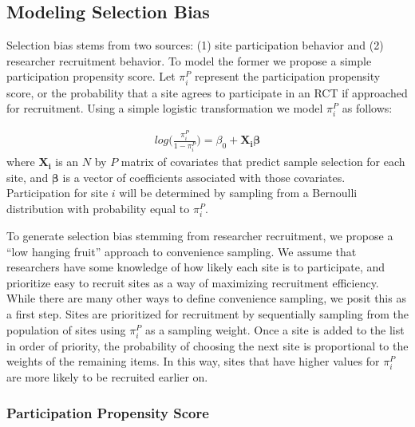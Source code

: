 \documentclass[man,floatsintext]{apa6}
\begin{document}
\hypertarget{modeling-selection-bias}{%
\subsection{Modeling Selection Bias}\label{modeling-selection-bias}}

Selection bias stems from two sources: (1) site participation behavior and (2) researcher recruitment behavior. To model the former we propose a simple participation propensity score. Let \(\pi^P_i\) represent the participation propensity score, or the probability that a site agrees to participate in an RCT if approached for recruitment. Using a simple logistic transformation we model \(\pi^P_i\) as follows:

\begin{align} \label{eq:RGM}
  log\bigg(\frac{\pi^P_i}{1 - \pi^P_i}\bigg) = \beta_0 + \boldsymbol{X_i \beta}
\end{align}
where \(\boldsymbol{X_i}\) is an \(N\) by \(P\) matrix of covariates that predict sample selection for each site, and \(\boldsymbol{\beta}\) is a vector of coefficients associated with those covariates. Participation for site \(i\) will be determined by sampling from a Bernoulli distribution with probability equal to \(\pi^P_i\).

To generate selection bias stemming from researcher recruitment, we propose a \enquote{low hanging fruit} approach to convenience sampling. We assume that researchers have some knowledge of how likely each site is to participate, and prioritize easy to recruit sites as a way of maximizing recruitment efficiency. While there are many other ways to define convenience sampling, we posit this as a first step. Sites are prioritized for recruitment by sequentially sampling from the population of sites using \(\pi^P_i\) as a sampling weight. Once a site is added to the list in order of priority, the probability of choosing the next site is proportional to the weights of the remaining items. In this way, sites that have higher values for \(\pi^P_i\) are more likely to be recruited earlier on.

\hypertarget{participation-propensity-score}{%
\subsubsection{Participation Propensity Score}\label{participation-propensity-score}}
\end{document}
